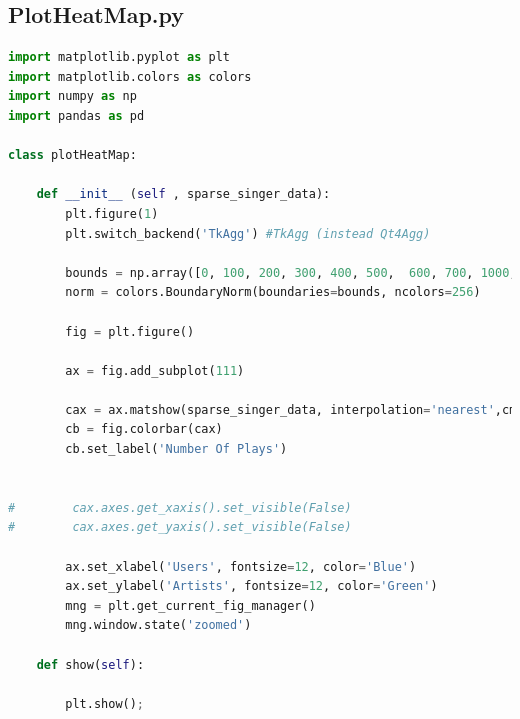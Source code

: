 \documentclass[paper=a4, fontsize=12pt]{scrartcl}
\numberwithin{equation}{section}		%
\numberwithin{figure}{section}			%
\numberwithin{table}{section}				%
\begin{document}
\subsection{PlotHeatMap.py}
\scriptsize
\begin{lstlisting}[language=Python]
import matplotlib.pyplot as plt
import matplotlib.colors as colors
import numpy as np
import pandas as pd

class plotHeatMap:
    
    def __init__ (self , sparse_singer_data):
        plt.figure(1)
        plt.switch_backend('TkAgg') #TkAgg (instead Qt4Agg)

        bounds = np.array([0, 100, 200, 300, 400, 500,  600, 700, 1000, 2000, 3000, 4000, 5000, 10000, 25000, 500000]) #MRS intervals
        norm = colors.BoundaryNorm(boundaries=bounds, ncolors=256)

        fig = plt.figure()
        
        ax = fig.add_subplot(111)

        cax = ax.matshow(sparse_singer_data, interpolation='nearest',cmap=plt.get_cmap('RdBu_r'), norm=norm)
        cb = fig.colorbar(cax)
        cb.set_label('Number Of Plays')


#        cax.axes.get_xaxis().set_visible(False)
#        cax.axes.get_yaxis().set_visible(False)

        ax.set_xlabel('Users', fontsize=12, color='Blue')
        ax.set_ylabel('Artists', fontsize=12, color='Green')
        mng = plt.get_current_fig_manager()
        mng.window.state('zoomed')

    def show(self):
        
        plt.show();

\end{lstlisting}
\end{document}
